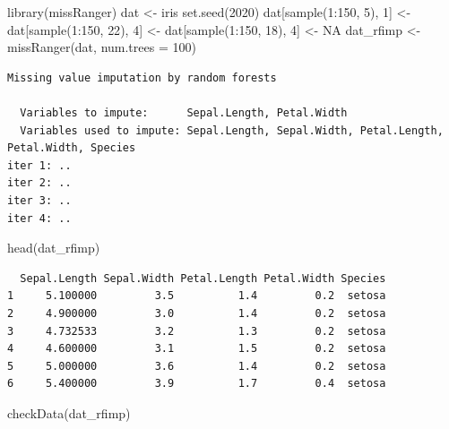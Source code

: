 \documentclass[
]{book}
\newenvironment{Shaded}{\begin{snugshade}}{\end{snugshade}}
\newcommand{\AttributeTok}[1]{\textcolor[rgb]{0.77,0.63,0.00}{#1}}
\newcommand{\ConstantTok}[1]{\textcolor[rgb]{0.00,0.00,0.00}{#1}}
\newcommand{\DecValTok}[1]{\textcolor[rgb]{0.00,0.00,0.81}{#1}}
\newcommand{\FunctionTok}[1]{\textcolor[rgb]{0.00,0.00,0.00}{#1}}
\newcommand{\NormalTok}[1]{#1}
\newcommand{\OtherTok}[1]{\textcolor[rgb]{0.56,0.35,0.01}{#1}}
\newcommand{\SpecialCharTok}[1]{\textcolor[rgb]{0.00,0.00,0.00}{#1}}
\begin{document}
\begin{Shaded}
\begin{Highlighting}[]
\FunctionTok{library}\NormalTok{(missRanger)}
\NormalTok{dat }\OtherTok{\textless{}{-}}\NormalTok{ iris}
\FunctionTok{set.seed}\NormalTok{(}\DecValTok{2020}\NormalTok{)}
\NormalTok{dat[}\FunctionTok{sample}\NormalTok{(}\DecValTok{1}\SpecialCharTok{:}\DecValTok{150}\NormalTok{, }\DecValTok{5}\NormalTok{), }\DecValTok{1}\NormalTok{] }\OtherTok{\textless{}{-}}\NormalTok{ dat[}\FunctionTok{sample}\NormalTok{(}\DecValTok{1}\SpecialCharTok{:}\DecValTok{150}\NormalTok{, }\DecValTok{22}\NormalTok{), }\DecValTok{4}\NormalTok{] }\OtherTok{\textless{}{-}}\NormalTok{ dat[}\FunctionTok{sample}\NormalTok{(}\DecValTok{1}\SpecialCharTok{:}\DecValTok{150}\NormalTok{, }\DecValTok{18}\NormalTok{), }\DecValTok{4}\NormalTok{] }\OtherTok{\textless{}{-}} \ConstantTok{NA}
\NormalTok{dat\_rfimp }\OtherTok{\textless{}{-}} \FunctionTok{missRanger}\NormalTok{(dat, }\AttributeTok{num.trees =} \DecValTok{100}\NormalTok{)}
\end{Highlighting}
\end{Shaded}

\begin{verbatim}
Missing value imputation by random forests

  Variables to impute:      Sepal.Length, Petal.Width
  Variables used to impute: Sepal.Length, Sepal.Width, Petal.Length, Petal.Width, Species
iter 1: ..
iter 2: ..
iter 3: ..
iter 4: ..
\end{verbatim}

\begin{Shaded}
\begin{Highlighting}[]
\FunctionTok{head}\NormalTok{(dat\_rfimp)}
\end{Highlighting}
\end{Shaded}

\begin{verbatim}
  Sepal.Length Sepal.Width Petal.Length Petal.Width Species
1     5.100000         3.5          1.4         0.2  setosa
2     4.900000         3.0          1.4         0.2  setosa
3     4.732533         3.2          1.3         0.2  setosa
4     4.600000         3.1          1.5         0.2  setosa
5     5.000000         3.6          1.4         0.2  setosa
6     5.400000         3.9          1.7         0.4  setosa
\end{verbatim}

\begin{Shaded}
\begin{Highlighting}[]
\FunctionTok{checkData}\NormalTok{(dat\_rfimp)}
\end{Highlighting}
\end{Shaded}
\end{document}
